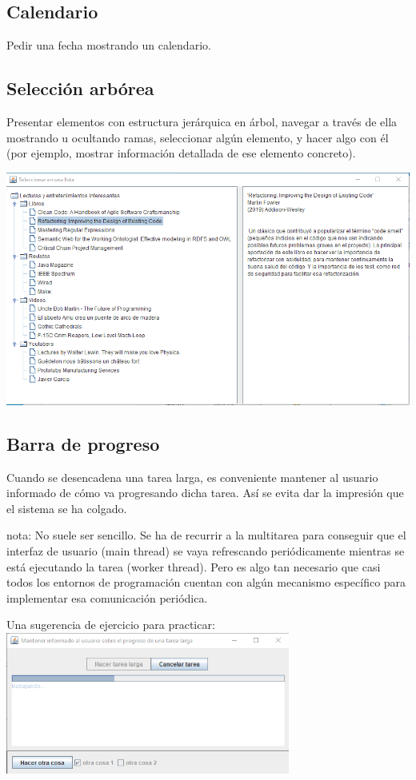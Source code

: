 \documentclass[spanish,12pt,a4paper,final,oneside]{book}
\begin{document}
\subsection{Calendario}\label{ejercicio_calendario}
Pedir una fecha mostrando un calendario.

\subsection{Selección arbórea}\label{ejercicio_selecionarborea}
Presentar elementos con estructura jerárquica en árbol, navegar a través de ella mostrando u ocultando ramas, seleccionar algún elemento, y hacer algo con él (por ejemplo, mostrar información detallada de ese elemento concreto).

\includegraphics[width=\textwidth]{Seleccion Arborea - pantallazo - Java}


\subsection{Barra de progreso}\label{ejercicio_barradeprogreso}
Cuando se desencadena una tarea larga, es conveniente mantener al usuario informado de cómo va progresando dicha tarea. Así se evita dar la impresión que el sistema se ha colgado.

nota: No suele ser sencillo. Se ha de recurrir a la multitarea para conseguir que el interfaz de usuario (main thread) se vaya refrescando periódicamente mientras se está ejecutando la tarea (worker thread). Pero es algo tan necesario que casi todos los entornos de programación cuentan con algún mecanismo específico para implementar esa comunicación periódica.

Una sugerencia de ejercicio para practicar:
\\ \includegraphics[width=0.7\textwidth]{BarraDeProgreso - pantallazo - Java}
\end{document}

